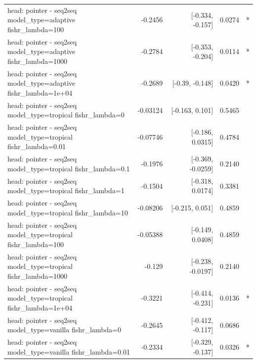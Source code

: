 \documentclass[10pt]{article}
\makeatletter
\newcommand{\stackcell}[1]{\begin{tabular}[t]{@{}l@{}}#1\end{tabular}}
\makeatother
\begin{document}
{\begin{longtable}{lrrrl}
\stackcell{head: pointer - seq2seq\\\footnotesize model\_type=adaptive fishr\_lambda=100 } & -0.2456 & [-0.334, -0.157] & 0.0274 & *\\
\stackcell{head: pointer - seq2seq\\\footnotesize model\_type=adaptive fishr\_lambda=1000 } & -0.2784 & [-0.353, -0.204] & 0.0114 & *\\
\stackcell{head: pointer - seq2seq\\\footnotesize model\_type=adaptive fishr\_lambda=1e+04 } & -0.2689 & [-0.39, -0.148] & 0.0420 & *\\
\stackcell{head: pointer - seq2seq\\\footnotesize model\_type=tropical fishr\_lambda=0 } & -0.03124 & [-0.163, 0.101] & 0.5465 & \\
\stackcell{head: pointer - seq2seq\\\footnotesize model\_type=tropical fishr\_lambda=0.01 } & -0.07746 & [-0.186, 0.0315] & 0.4784 & \\
\stackcell{head: pointer - seq2seq\\\footnotesize model\_type=tropical fishr\_lambda=0.1 } & -0.1976 & [-0.369, -0.0259] & 0.2140 & \\
\stackcell{head: pointer - seq2seq\\\footnotesize model\_type=tropical fishr\_lambda=1 } & -0.1504 & [-0.318, 0.0174] & 0.3381 & \\
\stackcell{head: pointer - seq2seq\\\footnotesize model\_type=tropical fishr\_lambda=10 } & -0.08206 & [-0.215, 0.051] & 0.4859 & \\
\stackcell{head: pointer - seq2seq\\\footnotesize model\_type=tropical fishr\_lambda=100 } & -0.05388 & [-0.149, 0.0408] & 0.4859 & \\
\stackcell{head: pointer - seq2seq\\\footnotesize model\_type=tropical fishr\_lambda=1000 } & -0.129 & [-0.238, -0.0197] & 0.2140 & \\
\stackcell{head: pointer - seq2seq\\\footnotesize model\_type=tropical fishr\_lambda=1e+04 } & -0.3221 & [-0.414, -0.231] & 0.0136 & *\\
\stackcell{head: pointer - seq2seq\\\footnotesize model\_type=vanilla fishr\_lambda=0 } & -0.2645 & [-0.412, -0.117] & 0.0686 & \\
\stackcell{head: pointer - seq2seq\\\footnotesize model\_type=vanilla fishr\_lambda=0.01 } & -0.2334 & [-0.329, -0.137] & 0.0326 & *\\

\end{longtable}}
\end{document}
